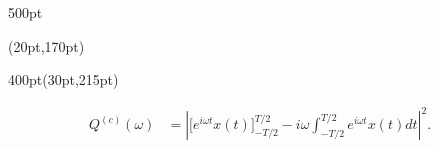 \begin{frame}
\begin{textblock*}{500pt}
\begin{minipage}{0.0\linewidth}
\end{minipage}
\end{textblock*}






\begin{textblock*}{\linewidth}(20pt,170pt)
\end{textblock*}


\begin{textblock*}{400pt}(30pt,215pt)
\scriptsize

\begin{align}
    Q^{(c)}(\omega) & = \left|\Bigg[ e^{i\omega t} x(t)\Bigg]_{-T/2}^{T/2}
               -i\omega \int_{-T/2}^{T/2} e^{i\omega t}x(t)dt\right|^2.
                \nonumber
\end{align}

\end{textblock*}

\end{frame}




